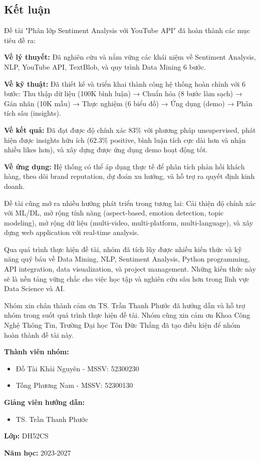\subsection{Kết luận}

Đề tài "Phân lớp Sentiment Analysis với YouTube API" đã hoàn thành các mục tiêu đề ra:

\textbf{Về lý thuyết:} Đã nghiên cứu và nắm vững các khái niệm về Sentiment Analysis, NLP, YouTube API, TextBlob, và quy trình Data Mining 6 bước.

\textbf{Về kỹ thuật:} Đã thiết kế và triển khai thành công hệ thống hoàn chỉnh với 6 bước: Thu thập dữ liệu (100K bình luận) → Chuẩn hóa (8 bước làm sạch) → Gán nhãn (10K mẫu) → Thực nghiệm (6 biểu đồ) → Ứng dụng (demo) → Phân tích sâu (insights).

\textbf{Về kết quả:} Đã đạt được độ chính xác 83\% với phương pháp unsupervised, phát hiện được insights hữu ích (62.3\% positive, bình luận tích cực dài hơn và nhận nhiều likes hơn), và xây dựng được ứng dụng demo hoạt động tốt.

\textbf{Về ứng dụng:} Hệ thống có thể áp dụng thực tế để phân tích phản hồi khách hàng, theo dõi brand reputation, dự đoán xu hướng, và hỗ trợ ra quyết định kinh doanh.

Đề tài cũng mở ra nhiều hướng phát triển trong tương lai: Cải thiện độ chính xác với ML/DL, mở rộng tính năng (aspect-based, emotion detection, topic modeling), mở rộng dữ liệu (multi-video, multi-platform, multi-language), và xây dựng web application với real-time analysis.

Qua quá trình thực hiện đề tài, nhóm đã tích lũy được nhiều kiến thức và kỹ năng quý báu về Data Mining, NLP, Sentiment Analysis, Python programming, API integration, data visualization, và project management. Những kiến thức này sẽ là nền tảng vững chắc cho việc học tập và nghiên cứu sâu hơn trong lĩnh vực Data Science và AI.

Nhóm xin chân thành cảm ơn TS. Trần Thanh Phước đã hướng dẫn và hỗ trợ nhóm trong suốt quá trình thực hiện đề tài. Nhóm cũng xin cảm ơn Khoa Công Nghệ Thông Tin, Trường Đại học Tôn Đức Thắng đã tạo điều kiện để nhóm hoàn thành đề tài này.

\vspace{1cm}

\textbf{Thành viên nhóm:}
\begin{itemize}
    \item Đỗ Tài Khải Nguyên - MSSV: 52300230
    \item Tống Phương Nam - MSSV: 52300130
\end{itemize}

\textbf{Giảng viên hướng dẫn:}
\begin{itemize}
    \item TS. Trần Thanh Phước
\end{itemize}

\textbf{Lớp:} DH52CS

\textbf{Năm học:} 2023-2027
